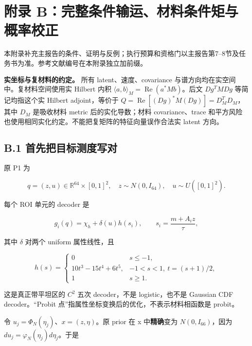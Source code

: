 \documentclass[
  11pt,
  a4paper,
]{article}
\begin{document}
\hypertarget{ux9644ux5f55-bux5b8cux6574ux6761ux4ef6ux8f93ux8fd0ux6750ux6599ux6761ux4ef6ux77e9ux4e0eux6982ux7387ux6821ux6b63}{%
\section{附录
B：完整条件输运、材料条件矩与概率校正}\label{ux9644ux5f55-bux5b8cux6574ux6761ux4ef6ux8f93ux8fd0ux6750ux6599ux6761ux4ef6ux77e9ux4e0eux6982ux7387ux6821ux6b63}}

本附录补充主报告的条件、证明与反例；执行预算和资格门以主报告第7--8节及任务书为准。参考文献编号在本附录独立加前缀。

\textbf{实坐标与复材料的约定。} 所有 latent、速度、covariance
与谱方向均在实空间中。复材料空间使用实 Hilbert 内积
\(\langle a,b\rangle_M=\operatorname{Re}(a^*Mb)\)。后文 \(Dg^TMDg\)
等简记均指这个实 Hilbert adjoint，等价于
\(Q=\operatorname{Re}[(Dg)^*M(Dg)]=D_M^TD_M\)，其中 \(D_M\) 是吸收材料
metric 后的实化导数；材料 covariance、trace
和平方风险也使用相同实化约定。不能把复矩阵的特征向量误作合法实 latent
方向。

\hypertarget{b.1-ux9996ux5148ux628aux76eeux6807ux6d4bux5ea6ux5199ux5bf9}{%
\subsection{B.1
首先把目标测度写对}\label{b.1-ux9996ux5148ux628aux76eeux6807ux6d4bux5ea6ux5199ux5bf9}}

原 P1 为

\[
q=(z,u)\in\mathbb{R}^{64}\times[0,1]^2,\quad z\sim N(0,I_{64}),\quad u\sim U([0,1]^2).
\]

每个 ROI 单元的 decoder 是

\[
g_i(q)=\chi_h+\delta(u)h(s_i),\qquad s_i=\frac{m+A_i z}{\tau},
\]

其中 \(\delta\) 对两个 uniform 属性线性，且

\[
h(s)=\begin{cases}0&s\le-1,\\10t^3-15t^4+6t^5,&-1<s<1,\ t=(s+1)/2,\\1&s\ge1.\end{cases}
\]

这是真正带平坦区的 \(C^2\) 五次 decoder，不是 logistic，也不是 Gaussian
CDF decoder。``Probit 点''指属性坐标变换后的优化，不表示材料相函数是
probit。

令 \(u_j=\Phi_N(\eta_j)\)、\(x=(z,\eta)\)。原 prior 在 x
中\textbf{精确}变为 \(N(0,I_{66})\)，因为
\(du_j=\varphi_N(\eta_j)d\eta_j\)。于是
\end{document}
